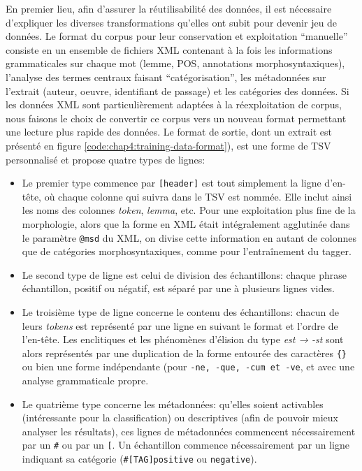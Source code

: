 En premier lieu, afin d'assurer la réutilisabilité des données, il est nécessaire d'expliquer les diverses transformations qu'elles ont subit pour devenir jeu de données. Le format du corpus pour leur conservation et exploitation \enquote{manuelle} consiste en un ensemble de fichiers XML contenant à la fois les informations grammaticales sur chaque mot (lemme, POS, annotations morphosyntaxiques), l'analyse des termes centraux faisant \enquote{catégorisation}, les métadonnées sur l'extrait (auteur, oeuvre, identifiant de passage) et les catégories des données. Si les données XML sont particulièrement adaptées à la réexploitation de corpus, nous faisons le choix de convertir ce corpus vers un nouveau format permettant une lecture plus rapide des données. Le format de sortie, dont un extrait est présenté en figure \ref{code:chap4:training-data-format}), est une forme de TSV personnalisé et propose quatre types de lignes:
\begin{itemize}
    \item Le premier type commence par \texttt{[header]} est tout simplement la ligne d'en-tête, où chaque colonne qui suivra dans le TSV est nommée. Elle inclut ainsi les noms des colonnes \textit{token}, \textit{lemma}, etc. Pour une exploitation plus fine de la morphologie, alors que la forme en XML était intégralement agglutinée dans le paramètre \texttt{@msd} du XML, on divise cette information en autant de colonnes que de catégories morphosyntaxiques, comme pour l'entraînement du tagger.
    \item Le second type de ligne est celui de division des échantillons: chaque phrase échantillon, positif ou négatif, est séparé par une à plusieurs lignes vides.
    \item Le troisième type de ligne concerne le contenu des échantillons: chacun de leurs \textit{tokens} est représenté par une ligne en suivant le format et l'ordre de l'en-tête. Les enclitiques et les phénomènes d'élision du type \textit{est → -st} sont alors représentés par une duplication de la forme entourée des caractères \texttt{\{\}} ou bien une forme indépendante (pour \texttt{-ne, -que, -cum et -ve}, et avec une analyse grammaticale propre.
    \item Le quatrième type concerne les métadonnées: qu'elles soient activables (intéressante pour la classification) ou descriptives (afin de pouvoir mieux analyser les résultats), ces lignes de métadonnées commencent nécessairement par un \texttt{\#} ou par un \texttt{[}. Un échantillon commence nécessairement par un ligne indiquant sa catégorie (\texttt{\#[TAG]positive} ou \texttt{negative}). 
\end{itemize}

